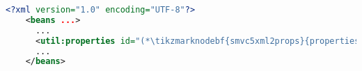 \begin{lstlisting}[language=XML, title={Spring XML configuration}]
    <?xml version="1.0" encoding="UTF-8"?>
    <beans ...>
      ...
      <util:properties id="(*\tikzmarknodebf{smvc5xml2props}{propertiesFileId}[ForestGreen]*)" location="WEB-INF/fileName.properties"/>
      ...
    </beans>
\end{lstlisting}
